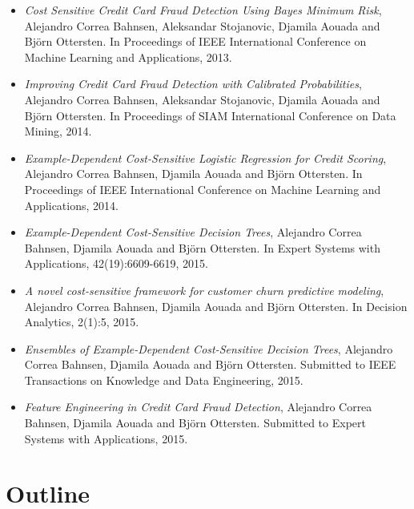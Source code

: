 \begin{itemize}
\item \citep{CorreaBahnsen2013} \textit{Cost Sensitive Credit Card Fraud Detection Using Bayes 
Minimum Risk}, Alejandro Correa Bahnsen,  Aleksandar Stojanovic, Djamila Aouada and Bj\"orn 
Ottersten. In Proceedings of IEEE International Conference on Machine Learning and Applications, 
2013.

\item \citep{CorreaBahnsen2014} \textit{Improving Credit Card Fraud Detection with Calibrated 
Probabilities}, Alejandro Correa Bahnsen, Aleksandar Stojanovic, Djamila Aouada and Bj\"orn 
Ottersten. In Proceedings of SIAM International Conference on Data Mining, 2014.

\item \citep{CorreaBahnsen2014b} \textit{Example-Dependent Cost-Sensitive Logistic Regression for 
Credit Scoring}, Alejandro Correa Bahnsen, Djamila Aouada and Bj\"orn Ottersten.
In Proceedings of IEEE International Conference on Machine Learning and Applications, 2014.

\item \citep{CorreaBahnsen2015} \textit{Example-Dependent Cost-Sensitive Decision Trees},
Alejandro Correa Bahnsen, Djamila Aouada and Bj\"orn Ottersten.
In Expert Systems with Applications, 42(19):6609-6619, 2015.

\item \citep{CorreaBahnsen2015a} \textit{A novel cost-sensitive framework for customer churn 
predictive modeling}, Alejandro Correa Bahnsen, Djamila Aouada and Bj\"orn Ottersten.
In Decision Analytics, 2(1):5, 2015.

\item \citep{CorreaBahnsen2015b} \textit{Ensembles of Example-Dependent Cost-Sensitive Decision 
Trees}, Alejandro Correa Bahnsen, Djamila Aouada and Bj\"orn Ottersten.
Submitted to IEEE Transactions on Knowledge and Data Engineering, 2015.

\item \citep{CorreaBahnsen2015c} \textit{Feature Engineering in Credit Card Fraud Detection},
Alejandro Correa Bahnsen, Djamila Aouada and Bj\"orn Ottersten. Submitted to Expert Systems with 
Applications, 2015.

\end{itemize}


\section{Outline}

